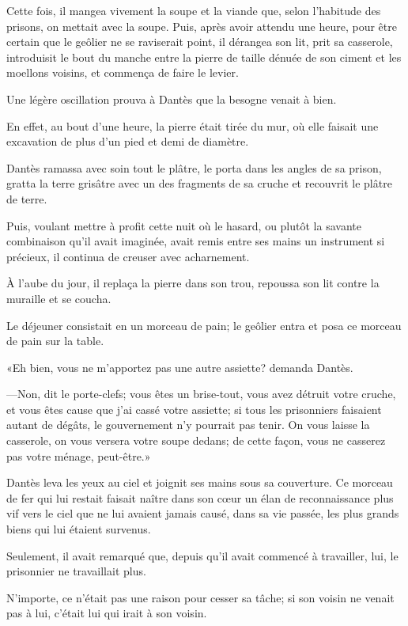 Cette fois, il mangea vivement la soupe et la viande que, selon l'habitude des prisons, on mettait avec la soupe. Puis, après avoir attendu une heure, pour être certain que le geôlier ne se raviserait point, il dérangea son lit, prit sa casserole, introduisit le bout du manche entre la pierre de taille dénuée de son ciment et les moellons voisins, et commença de faire le levier.

Une légère oscillation prouva à Dantès que la besogne venait à bien.

En effet, au bout d'une heure, la pierre était tirée du mur, où elle faisait une excavation de plus d'un pied et demi de diamètre.

Dantès ramassa avec soin tout le plâtre, le porta dans les angles de sa prison, gratta la terre grisâtre avec un des fragments de sa cruche et recouvrit le plâtre de terre.

Puis, voulant mettre à profit cette nuit où le hasard, ou plutôt la savante combinaison qu'il avait imaginée, avait remis entre ses mains un instrument si précieux, il continua de creuser avec acharnement.

À l'aube du jour, il replaça la pierre dans son trou, repoussa son lit contre la muraille et se coucha.

Le déjeuner consistait en un morceau de pain; le geôlier entra et posa ce morceau de pain sur la table.

«Eh bien, vous ne m'apportez pas une autre assiette? demanda Dantès.

—Non, dit le porte-clefs; vous êtes un brise-tout, vous avez détruit votre cruche, et vous êtes cause que j'ai cassé votre assiette; si tous les prisonniers faisaient autant de dégâts, le gouvernement n'y pourrait pas tenir. On vous laisse la casserole, on vous versera votre soupe dedans; de cette façon, vous ne casserez pas votre ménage, peut-être.»

Dantès leva les yeux au ciel et joignit ses mains sous sa couverture. Ce morceau de fer qui lui restait faisait naître dans son cœur un élan de reconnaissance plus vif vers le ciel que ne lui avaient jamais causé, dans sa vie passée, les plus grands biens qui lui étaient survenus.

Seulement, il avait remarqué que, depuis qu'il avait commencé à travailler, lui, le prisonnier ne travaillait plus.

N'importe, ce n'était pas une raison pour cesser sa tâche; si son voisin ne venait pas à lui, c'était lui qui irait à son voisin.

